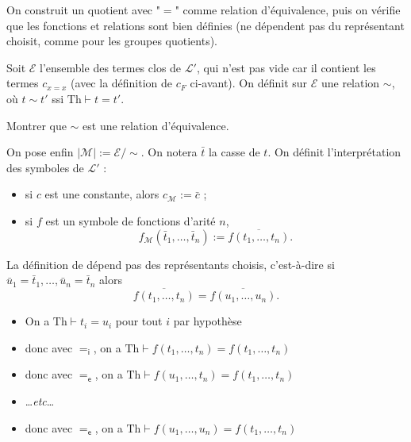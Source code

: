 \documentclass[./main]{subfiles}
\begin{document}
  On construit un quotient avec "$=$" comme relation d'équivalence, puis on vérifie que les fonctions et relations sont bien définies (ne dépendent pas du représentant choisit, comme pour les groupes quotients).

  Soit $\mathcal{E}$ l'ensemble des termes clos de $\mathcal{L}'$, qui n'est pas vide car il contient les termes $c_{x = x}$ (avec la définition de $c_F$ ci-avant).
  On définit sur $\mathcal{E}$ une relation $\sim$, où $t \sim t'$ ssi $\mathrm{Th} \vdash t = t'$.

  \begin{exo}
    Montrer que $\sim$ est une relation d'équivalence.
  \end{exo}

  On pose enfin $|\mathcal{M}| := \mathcal{E} / {\sim}$.
  On notera $\bar{t}$ la casse de $t$.
  On définit l'interprétation des symboles de $\mathcal{L}'$ :
  \begin{itemize}
    \item si $c$ est une constante, alors $c_{\mathcal{M}} := \bar{c}$ ;
    \item si $f$ est un symbole de fonctions d'arité $n$, \[
        f_{\mathcal{M}}(\bar{t}_1, \ldots, \bar{t}_n) := \overline{f(t_1, \ldots, t_n)}
      .\]
  \end{itemize}

  \begin{lem}
    La définition de dépend pas des représentants choisis, c'est-à-dire 
    si $\bar{u}_1 = \bar{t}_1, \ldots, \bar{u}_n = \bar{t}_n$ alors \[
      \overline{f(t_1, \ldots, t_n)} = \overline{f(u_1, \ldots, u_n)}
    .\] 
  \end{lem}
  \begin{prv}
    \begin{itemize}
      \item On a $\mathrm{Th} \vdash t_i = u_i$ pour tout $i$ par hypothèse
      \item donc avec $=_\mathsf{i}$, on a $\mathrm{Th} \vdash f(t_1, \ldots, t_n) = f(t_1, \ldots, t_n)$
      \item donc avec $=_\mathsf{e}$, on a $\mathrm{Th} \vdash f(u_1, \ldots, t_n) = f(t_1, \ldots, t_n)$
      \item \ldots\textit{etc}\ldots
      \item donc avec $=_\mathsf{e}$, on a $\mathrm{Th} \vdash f(u_1, \ldots, u_n) = f(t_1, \ldots, t_n)$
    \end{itemize}
  \end{prv}
\end{document}
